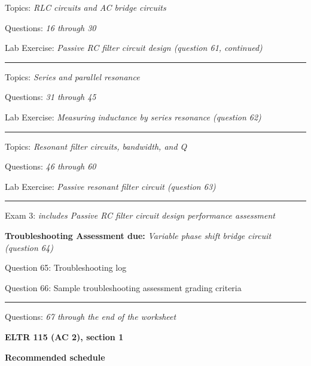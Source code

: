 \hskip 10pt Topics: {\it RLC circuits and AC bridge circuits}
 
\hskip 10pt Questions: {\it 16 through 30}
 
\hskip 10pt Lab Exercise: {\it Passive RC filter circuit design (question 61, continued)}
 
\vskip 10pt
\hrule \vskip 5pt
\noindent
{}

\hskip 10pt Topics: {\it Series and parallel resonance}
 
\hskip 10pt Questions: {\it 31 through 45}
 
\hskip 10pt Lab Exercise: {\it Measuring inductance by series resonance (question 62)}
 
\vskip 10pt
\hrule \vskip 5pt
\noindent
{}

\hskip 10pt Topics: {\it Resonant filter circuits, bandwidth, and Q}
 
\hskip 10pt Questions: {\it 46 through 60}
 
\hskip 10pt Lab Exercise: {\it Passive resonant filter circuit (question 63)}
 

\vskip 10pt
\hrule \vskip 5pt
\noindent
{}

\hskip 10pt Exam 3: {\it includes Passive RC filter circuit design performance assessment}
 
\hskip 10pt {\bf Troubleshooting Assessment due:} {\it Variable phase shift bridge circuit (question 64)}
 
\hskip 10pt Question 65: Troubleshooting log
 
\hskip 10pt Question 66: Sample troubleshooting assessment grading criteria
 
\vskip 10pt
\hrule \vskip 5pt
\noindent
{}

\hskip 10pt Questions: {\it 67 through the end of the worksheet}
 
\vskip 10pt








\vfil \eject

\centerline{\bf ELTR 115 (AC 2), section 1} \bigskip 
 
\vskip 10pt

\noindent
{\bf Recommended schedule}

